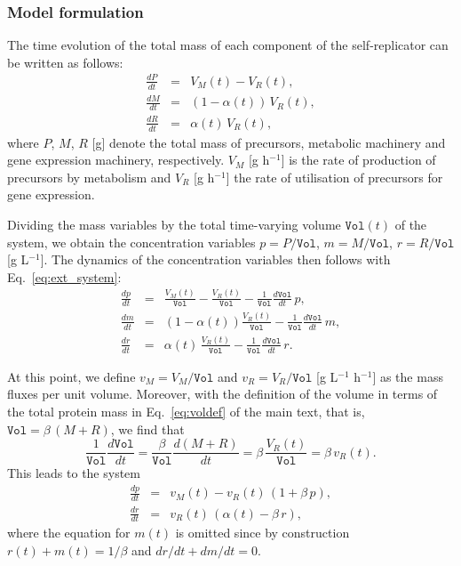 \subsubsection{Model formulation}

The time evolution of the total mass of each component of the self-replicator can be written as follows:
\begin{eqnarray}
\frac{dP}{dt} &=& V_M(t) - V_R(t) \nonumber , \\
\frac{dM}{dt} &=& (1-\alpha(t))\, V_R(t) \label{eq:ext_system},\\
\frac{dR}{dt} &=& \alpha(t) \, V_R(t)  \nonumber ,
\end{eqnarray}
where $P$, $M$, $R$ [g] denote the total mass of precursors, metabolic machinery and gene expression machinery, respectively.
$V_M$ [g h$^{-1}$] is the rate of production of precursors by metabolism and $V_R$ [g h$^{-1}$] the rate of utilisation of precursors for gene expression.

Dividing the mass variables by the total time-varying volume $\texttt{Vol}(t)$ of the system, we obtain the concentration variables $p = P/\texttt{Vol}$, $m = M/\texttt{Vol}$, $r = R/\texttt{Vol}$ [g L$^{-1}$].
The dynamics of the concentration variables then follows with Eq.~\ref{eq:ext_system}:
\begin{eqnarray}
\frac{dp}{dt} &=& \frac{V_M(t)}{\texttt{Vol}} - \frac{V_R(t)}{\texttt{Vol}} - \frac{1}{\texttt{Vol}}\frac{d\texttt{Vol}}{dt}\, p, \nonumber \\
\frac{dm}{dt} &=& (1-\alpha(t)) \frac{V_R(t)}{\texttt{Vol}} - \frac{1}{\texttt{Vol}}\frac{d\texttt{Vol}}{dt} \, m  \label{eq:deriv_int_system},\\ 
\frac{dr}{dt} &=& \alpha(t) \, \frac{V_R(t)}{\texttt{Vol}}  - \frac{1}{\texttt{Vol}}\frac{d\texttt{Vol}}{dt} \, r. \nonumber
\end{eqnarray}

At this point, we define $v_M = V_M/\texttt{Vol}$ and $v_R = V_R/\texttt{Vol}$ [g L$^{-1}$ h$^{-1}$] as the mass fluxes per unit volume.
Moreover, with the definition of the volume in terms of the total protein mass in Eq.~\ref{eq:voldef} of the main text, that is, $\texttt{Vol} = \beta\, (M + R)$, we find that
\begin{equation}
\label{eq:supp_deriv_growthrate}
\frac{1}{\texttt{Vol}} \frac{d\texttt{Vol}}{dt} = \frac{\beta}{\texttt{Vol}} \frac{d(M+R)}{dt} = \beta\, \frac{V_R(t)}{\texttt{Vol}} = \beta \, v_R(t).
\end{equation}
This leads to the system
\begin{eqnarray}
\frac{dp}{dt} &=& v_M(t) - v_R(t) \, (1+\beta\, p), \label{eq:supp_pdef}\\
\frac{dr}{dt} &=& v_R(t)  \, (\alpha(t) - \beta\, r) \label{eq:supp_rdef},
\end{eqnarray}
where the equation for $m(t)$ is omitted since by construction $r(t) + m(t) = 1/\beta$ and $dr/dt + dm/dt = 0$.

